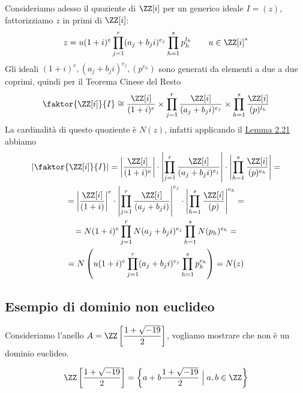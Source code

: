 \documentclass[11pt]{scrartcl}
\begin{document}
	Consideriamo adesso il quoziente di $\ZZ[i]$ per un generico ideale $I = (z)$,
	fattorizziamo $z$ in primi di $\ZZ[i]$:
	\[
	z = u(1 + i)^e\prod_{j = 1}^r (a_j + b_j i)^{e_j}\prod_{h = 1}^s p_h^{l_h}
	\qquad u \in \ZZ[i]^*
	\]
	Gli ideali $(1 + i)^e, (a_j + b_ji)^{e_j}, (p^{e_h})$ sono generati da elementi a due a due coprimi,
	quindi per il Teorema Cinese del Resto
	\[
	\faktor{\ZZ[i]}{I} \cong \frac{\ZZ[i]}{(1 + i)^e}\times
	\prod_{j = 1}^r\frac{\ZZ[i]}{(a_j + b_ji)^{e_j}}
	\times \prod_{h = 1}^s \frac{\ZZ[i]}{(p)^{l_h}}
	\]
	La cardinalità di questo quoziente è $N(z)$, infatti applicando il 
	\hyperref[lemma2.21]{Lemma 2.21} abbiamo
	\begin{multline*}
		\left|\faktor{\ZZ[i]}{I}\right| = \left|\frac{\ZZ[i]}{(1 + i)^e}\right|\cdot
		\left|\prod_{j = 1}^r\frac{\ZZ[i]}{(a_j + b_ji)^{e_j}}\right|\cdot
		\left|\prod_{h = 1}^s \frac{\ZZ[i]}{(p)^{e_h}}\right| = \\
		= \left|\frac{\ZZ[i]}{(1 + i)}\right|^e\cdot
		\left|\prod_{j = 1}^r\frac{\ZZ[i]}{(a_j + b_ji)}\right|^{e_j}\cdot
		\left|\prod_{h = 1}^s \frac{\ZZ[i]}{(p)}\right|^{e_h} = \\
		= N(1 + i)^e\prod_{j = 1}^r N(a_j + b_ji)^{e_j}\prod_{h = 1}^s N(p_h)^{e_h} = \\
		= N\left(u(1 + i)^e\prod_{j = 1}^r (a_j + b_j i)^{e_j}\prod_{h = 1}^s p_h^{e_h}\right)
		= N(z)\\
	\end{multline*}
	
	\newpage
	
	\subsection{Esempio di dominio non euclideo}
	
	Consideriamo l'anello $\displaystyle A = \ZZ\left[\frac{1 + \sqrt{-19}}{2}\right]$,
	vogliamo mostrare che non è un dominio euclideo. 
	
	\begin{proposition}
		\[
		\ZZ\left[\frac{1 + \sqrt{-19}}{2}\right] = 
		\left\{a + b\frac{1 + \sqrt{-19}}{2}\Bigm| a, b \in \ZZ\right\}
		\]
	\end{proposition}
	
\end{document}
